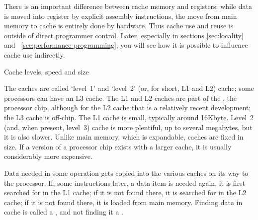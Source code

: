 There is an important difference between cache memory and registers:
while data is moved into register by explicit assembly instructions,
the move from main memory to cache is entirely done by hardware.  Thus
cache use and reuse is outside of direct programmer control. Later,
especially in sections \ref{sec:locality} and
~\ref{sec:performance-programming}, you will see how it is possible to
influence cache use indirectly.

 {Cache levels, speed and size}
\label{sec:cache-level}

The caches are called `level~1' and `level~2' (or, for short, L1 and
L2) cache; some processors can have an L3 cache.  The L1 and L2 caches
are part of the , the processor chip, although for the
L2 cache that is a relatively recent development; the L3 cache is
off-chip.  The L1 cache is small, typically around 16Kbyte. Level~2
(and, when present, level~3) cache is more plentiful, up to several
megabytes, but it is also slower.  Unlike main memory, which is
expandable, caches are fixed in size. If a version of a processor chip
exists with a larger cache, it is usually considerably more expensive.

Data needed in some operation gets copied into the various
caches on its way to the processor. If, some instructions later, a
data item is needed again, it is first searched for in the L1 cache; if it is
not found there, it is searched for in the L2 cache; if it is not found there,
it is loaded from main memory. Finding data in cache is called a
, and not finding it a .

